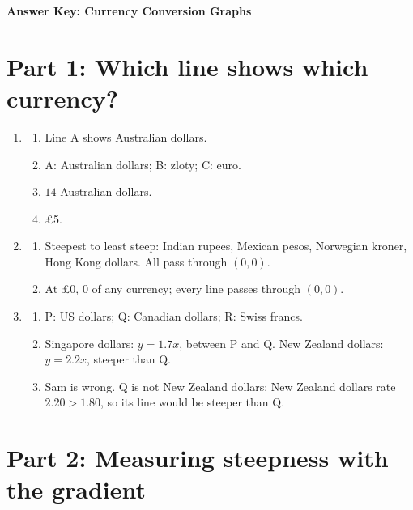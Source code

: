 \documentclass[12pt,a4paper]{article}
\begin{document}
\begin{center}
{\LARGE\bfseries Answer Key: Currency Conversion Graphs}
\end{center}
\vspace{6pt}

\section*{Part 1: Which line shows which currency?}

\begin{enumerate}
\item
\begin{enumerate}
\item Line A shows Australian dollars.
\item A: Australian dollars; B: zloty; C: euro.
\item \(14\) Australian dollars.
\item \pounds5.
\end{enumerate}

\item
\begin{enumerate}
\item Steepest to least steep: Indian rupees, Mexican pesos, Norwegian kroner, Hong Kong dollars. All pass through \((0,0)\).
\item At \pounds0, \(0\) of any currency; every line passes through \((0,0)\).
\end{enumerate}

\item
\begin{enumerate}
\item P: US dollars; Q: Canadian dollars; R: Swiss francs.
\item Singapore dollars: \(y=1.7x\), between P and Q. New Zealand dollars: \(y=2.2x\), steeper than Q.
\item Sam is wrong. Q is not New Zealand dollars; New Zealand dollars rate \(2.20>1.80\), so its line would be steeper than Q.
\end{enumerate}
\end{enumerate}

\section*{Part 2: Measuring steepness with the gradient}
\end{document}
